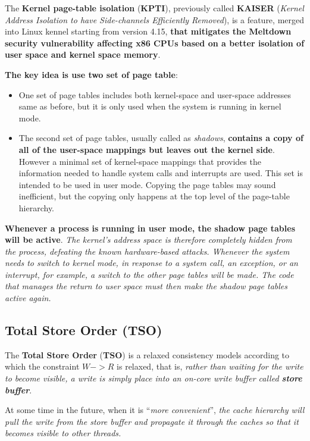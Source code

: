 \documentclass[10pt,a4paper]{article}
\begin{document}
The \textbf{Kernel page-table isolation} (\textbf{KPTI}), previously called \textbf{KAISER} (\textit{Kernel Address Isolation to have Side-channels Efficiently Removed}), is a feature, merged into Linux kennel starting from version 4.15, \textbf{that mitigates the Meltdown security vulnerability affecting x86 CPUs based on a better isolation of user space and kernel space memory}.

\textbf{The key idea is use two set of page table}:
\begin{itemize}
\item One set of page tables includes both kernel-space and user-space addresses same as before, but it is only used when the system is running in kernel mode.
\item The second set of page tables, usually called as \textit{shadows}, \textbf{contains a copy of all of the user-space mappings but leaves out the kernel side}. However a minimal set of kernel-space mappings that provides the information needed to handle system calls and interrupts are used. This set is intended to be used in user mode. Copying the page tables may sound inefficient, but the copying only happens at the top level of the page-table hierarchy.
\end{itemize}

\textbf{Whenever a process is running in user mode, the shadow page tables will be active}. \textit{The kernel's address space is therefore completely hidden from the process, defeating the known hardware-based attacks. Whenever the system needs to switch to kernel mode, in response to a system call, an exception, or an interrupt, for example, a switch to the other page tables will be made. The code that manages the return to user space must then make the shadow page tables active again.}

\subsection{Total Store Order (TSO)}

The \textbf{Total Store Order} (\textbf{TSO}) is a relaxed consistency models according to which the constraint $W->R$ is relaxed, that is, \textit{rather than waiting for the write to become visible, a write is simply place into an on-core write buffer called \textbf{store buffer}}.

At some time in the future, when it is ``\textit{more convenient}'', \textit{the cache hierarchy will pull the write from the store buffer and propagate it through the caches so that it becomes visible to other threads.}
\end{document}
